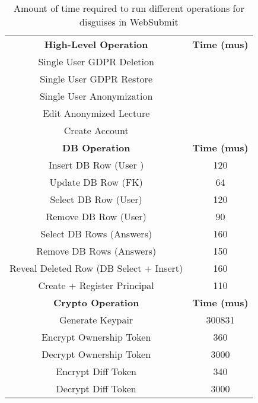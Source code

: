 \begin{table}
\begin{center}
\begin{tabular}{ c c }
 \textbf{High-Level Operation} & \textbf{Time (mus)}\\
    Single User GDPR Deletion & \\
    Single User GDPR Restore & \\
    Single User Anonymization & \\
    Edit Anonymized Lecture& \\
    Create Account & \\
\hline
    \textbf{DB Operation} & \textbf{Time (mus)}\\
\hline
Insert DB Row (User )& 120\\
Update DB Row (FK) & 64\\ 
Select DB Row (User) & 120\\
Remove DB Row (User) & 90\\
Select DB Rows (Answers) & 160\\
Remove DB Rows (Answers) & 150\\
Reveal Deleted Row (DB Select + Insert) & 160 \\
Create + Register Principal & 110\\
\hline
    \textbf{Crypto Operation} & \textbf{Time (mus)}\\
\hline
Generate Keypair & 300831\\
Encrypt Ownership Token & 360\\
Decrypt Ownership Token & 3000\\
Encrypt Diff Token & 340\\
Decrypt Diff Token & 3000\\
\end{tabular}
\end{center}
\caption{Amount of time required to run different operations for disguises in WebSubmit}
\end{table}
